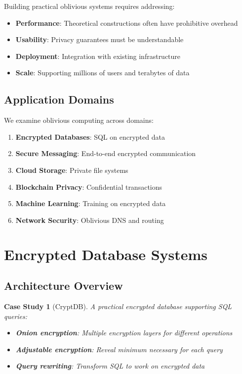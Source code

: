 \documentclass[11pt,final,hidelinks]{article}
\newtheorem{casestudy}[theorem]{Case Study}
\begin{document}
Building practical oblivious systems requires addressing:
\begin{itemize}
    \item \textbf{Performance}: Theoretical constructions often have prohibitive overhead
    \item \textbf{Usability}: Privacy guarantees must be understandable
    \item \textbf{Deployment}: Integration with existing infrastructure
    \item \textbf{Scale}: Supporting millions of users and terabytes of data
\end{itemize}

\subsection{Application Domains}

We examine oblivious computing across domains:
\begin{enumerate}
    \item \textbf{Encrypted Databases}: SQL on encrypted data
    \item \textbf{Secure Messaging}: End-to-end encrypted communication
    \item \textbf{Cloud Storage}: Private file systems
    \item \textbf{Blockchain Privacy}: Confidential transactions
    \item \textbf{Machine Learning}: Training on encrypted data
    \item \textbf{Network Security}: Oblivious DNS and routing
\end{enumerate}

\section{Encrypted Database Systems}

\subsection{Architecture Overview}

\begin{casestudy}[CryptDB]
A practical encrypted database supporting SQL queries:
\begin{itemize}
    \item \textbf{Onion encryption}: Multiple encryption layers for different operations
    \item \textbf{Adjustable encryption}: Reveal minimum necessary for each query
    \item \textbf{Query rewriting}: Transform SQL to work on encrypted data
\end{itemize}
\end{casestudy}
\end{document}
